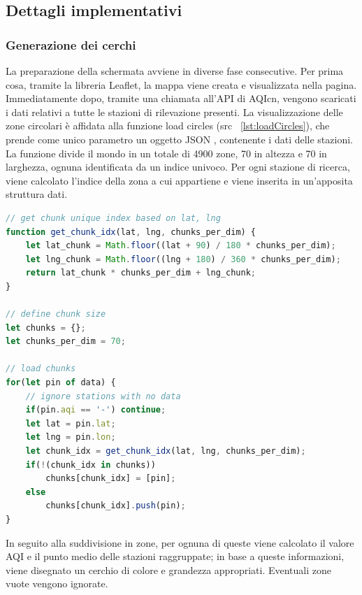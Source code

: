 \subsection{Dettagli implementativi}
\subsubsection{Generazione dei cerchi}
La preparazione della schermata avviene in diverse fase consecutive.
Per prima cosa, tramite la libreria Leaflet, la mappa viene creata e visualizzata nella pagina.
Immediatamente dopo, tramite una chiamata all'API di AQIcn, vengono scaricati i dati relativi a tutte le stazioni di rilevazione presenti.
La visualizzazione delle zone circolari è affidata alla funzione load circles (src ~\ref{lst:loadCircles}), che prende come unico parametro un oggetto JSON \cite{json}, contenente i dati delle stazioni.
La funzione divide il mondo in un totale di 4900 zone, 70 in altezza e 70 in larghezza, ognuna identificata da un indice univoco.
Per ogni stazione di ricerca, viene calcolato l'indice della zona a cui appartiene e viene inserita in un'apposita struttura dati.
\label{lst:loadCircles}
\begin{lstlisting}[language=Javascript]
// get chunk unique index based on lat, lng
function get_chunk_idx(lat, lng, chunks_per_dim) {
    let lat_chunk = Math.floor((lat + 90) / 180 * chunks_per_dim);
    let lng_chunk = Math.floor((lng + 180) / 360 * chunks_per_dim);
    return lat_chunk * chunks_per_dim + lng_chunk;
}

// define chunk size
let chunks = {};
let chunks_per_dim = 70;   

// load chunks
for(let pin of data) {
    // ignore stations with no data
    if(pin.aqi == '-') continue;
    let lat = pin.lat;
    let lng = pin.lon;
    let chunk_idx = get_chunk_idx(lat, lng, chunks_per_dim);
    if(!(chunk_idx in chunks)) 
        chunks[chunk_idx] = [pin];
    else 
        chunks[chunk_idx].push(pin);
}
\end{lstlisting}
In seguito alla suddivisione in zone, per ognuna di queste viene calcolato il valore AQI e il punto medio delle stazioni raggruppate; 
in base a queste informazioni, viene disegnato un cerchio di colore e grandezza appropriati. Eventuali zone vuote vengono ignorate.


